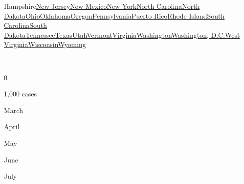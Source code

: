 {Hampshire}\href{https://www.nytimes.com/interactive/2020/us/new-jersey-coronavirus-cases.html}{New
Jersey}\href{https://www.nytimes.com/interactive/2020/us/new-mexico-coronavirus-cases.html}{New
Mexico}\href{https://www.nytimes.com/interactive/2020/us/new-york-coronavirus-cases.html}{New
York}\href{https://www.nytimes.com/interactive/2020/us/north-carolina-coronavirus-cases.html}{North
Carolina}\href{https://www.nytimes.com/interactive/2020/us/north-dakota-coronavirus-cases.html}{North
Dakota}\href{https://www.nytimes.com/interactive/2020/us/ohio-coronavirus-cases.html}{Ohio}\href{https://www.nytimes.com/interactive/2020/us/oklahoma-coronavirus-cases.html}{Oklahoma}\href{https://www.nytimes.com/interactive/2020/us/oregon-coronavirus-cases.html}{Oregon}\href{https://www.nytimes.com/interactive/2020/us/pennsylvania-coronavirus-cases.html}{Pennsylvania}\href{https://www.nytimes.com/interactive/2020/us/puerto-rico-coronavirus-cases.html}{Puerto
Rico}\href{https://www.nytimes.com/interactive/2020/us/rhode-island-coronavirus-cases.html}{Rhode
Island}\href{https://www.nytimes.com/interactive/2020/us/south-carolina-coronavirus-cases.html}{South
Carolina}\href{https://www.nytimes.com/interactive/2020/us/south-dakota-coronavirus-cases.html}{South
Dakota}\href{https://www.nytimes.com/interactive/2020/us/tennessee-coronavirus-cases.html}{Tennessee}\href{https://www.nytimes.com/interactive/2020/us/texas-coronavirus-cases.html}{Texas}\href{https://www.nytimes.com/interactive/2020/us/utah-coronavirus-cases.html}{Utah}\href{https://www.nytimes.com/interactive/2020/us/vermont-coronavirus-cases.html}{Vermont}\href{https://www.nytimes.com/interactive/2020/us/virginia-coronavirus-cases.html}{Virginia}\href{https://www.nytimes.com/interactive/2020/us/washington-coronavirus-cases.html}{Washington}\href{https://www.nytimes.com/interactive/2020/us/washington-dc-coronavirus-cases.html}{Washington,
D.C.}\href{https://www.nytimes.com/interactive/2020/us/west-virginia-coronavirus-cases.html}{West
Virginia}\href{https://www.nytimes.com/interactive/2020/us/wisconsin-coronavirus-cases.html}{Wisconsin}\href{https://www.nytimes.com/interactive/2020/us/wyoming-coronavirus-cases.html}{Wyoming}

~

0

1,000 cases

March

April

May

June

July


